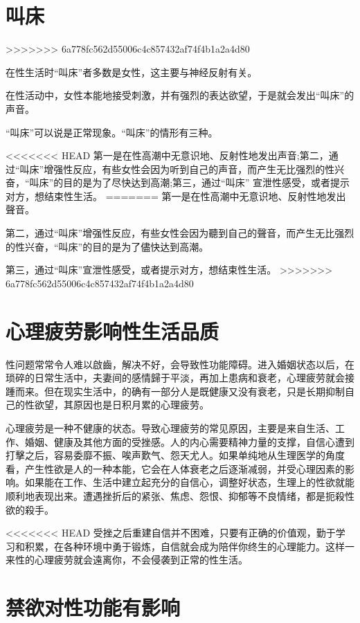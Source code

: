 \documentclass[12pt,UTF8]{ctexbook}
\begin{document}
\section{叫床}
>>>>>>> 6a778fc562d55006c4c857432af74f4b1a2a4d80

在性生活时“叫床”者多数是女性，这主要与神经反射有关。

在性活动中，女性本能地接受刺激，并有强烈的表达欲望，于是就会发出“叫床”的声音。

“叫床”可以说是正常现象。“叫床”的情形有三种。

<<<<<<< HEAD
第一是在性高潮中无意识地、反射性地发出声音;第二，通过“叫床”增强性反应，有些女性会因为听到自己的声音，而产生无比强烈的性兴奋，“叫床”的目的是为了尽快达到高潮;第三，通过“叫床”
宣泄性感受，或者提示对方，想结束性生活。
=======
第一是在性高潮中无意识地、反射性地发出聲音。

第二，通过“叫床”增强性反应，有些女性会因为聽到自己的聲音，而产生无比强烈的性兴奋，“叫床”的目的是为了儘快达到高潮。

第三，通过“叫床”宣泄性感受，或者提示对方，想结束性生活。
>>>>>>> 6a778fc562d55006c4c857432af74f4b1a2a4d80

\section{心理疲劳影响性生活品质}

性问题常常令人难以啟齒，解决不好，会导致性功能障碍。进入婚姻状态以后，在琐碎的日常生活中，夫妻间的感情歸于平淡，再加上患病和衰老，心理疲劳就会接踵而来。但在现实生活中，的确有一部分人是既健康又没有衰老，只是长期抑制自己的性欲望，其原因也是日积月累的心理疲劳。

心理疲劳是一种不健康的状态。导致心理疲劳的常见原因，主要是来自生活、工作、婚姻、健康及其他方面的受挫感。人的内心需要精神力量的支撑，自信心遭到打擊之后，容易委靡不振、唉声歎气、怨天尤人。如果单纯地从生理医学的角度看，产生性欲是人的一种本能，它会在人体衰老之后逐渐减弱，并受心理因素的影响。如果能在工作、生活中建立起充分的自信心，调整好状态，生理上的性欲就能顺利地表现出来。遭遇挫折后的紧张、焦虑、怨恨、抑郁等不良情绪，都是扼殺性欲的殺手。

<<<<<<< HEAD
受挫之后重建自信并不困难，只要有正确的价值观，勤于学习和积累，在各种环境中勇于锻炼，自信就会成为陪伴你终生的心理能力。这样一来性的心理疲劳就会遠离你，不会侵袭到正常的性生活。

\section{禁欲对性功能有影响}
\end{document}

